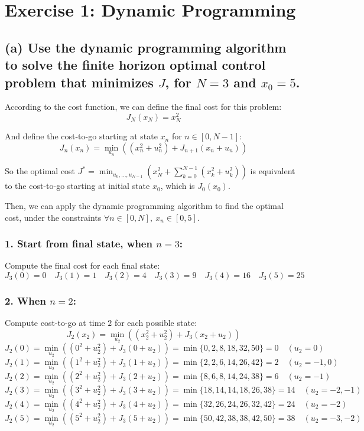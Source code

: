 \section*{Exercise 1: Dynamic Programming}

\subsection*{(a) Use the dynamic programming algorithm to solve the finite horizon optimal control problem that minimizes \( J \), for \( N = 3 \) and \( x_0 = 5 \).}

According to the cost function, we can define the final cost for this problem:
\[ J_N(x_N) = x_N^2 \]

And define the cost-to-go starting at state \( x_n \) for \( n \in [0, N-1] \):
\[ J_n(x_n) = \min_{u_n} ((x_n^2 + u_n^2) + J_{n+1}(x_n + u_n)) \]

So the optimal cost \( J^* = \min_{u_0, \ldots, u_{N-1}}(x_N^2 + \sum_{k=0}^{N-1} (x_k^2 + u_k^2)) \) is equivalent to the cost-to-go starting at initial state \( x_0 \), which is \( J_0(x_0) \).

Then, we can apply the dynamic programming algorithm to find the optimal cost, under the constraints \( \forall n \in [0, N], \ x_n \in [0, 5] \).

\subsubsection*{1. Start from final state, when \( n = 3 \):}
Compute the final cost for each final state:
\[
    J_3(0) = 0 \quad
    J_3(1) = 1 \quad
    J_3(2) = 4 \quad
    J_3(3) = 9 \quad
    J_3(4) = 16 \quad
    J_3(5) = 25
\]

\subsubsection*{2. When \( n = 2 \):}
Compute cost-to-go at time \( 2 \) for each possible state:
\[ J_2(x_2) = \min_{u_2} ((x_2^2 + u_2^2) + J_{3}(x_2 + u_2)) \]
\[ J_2(0) = \min_{u_2} ((0^2 + u_2^2) + J_{3}(0 + u_2)) = \min \{ 0, 2, 8, 18, 32, 50 \} = 0 \quad (u_2 = 0) \]
\[ J_2(1) = \min_{u_2} ((1^2 + u_2^2) + J_{3}(1 + u_2)) = \min \{ 2, 2, 6, 14, 26, 42 \} = 2 \quad (u_2 = -1, 0) \]
\[ J_2(2) = \min_{u_2} ((2^2 + u_2^2) + J_{3}(2 + u_2)) = \min \{ 8, 6, 8, 14, 24, 38 \} = 6 \quad (u_2 = -1) \]
\[ J_2(3) = \min_{u_2} ((3^2 + u_2^2) + J_{3}(3 + u_2)) = \min \{ 18, 14, 14, 18, 26, 38 \} = 14 \quad (u_2 = -2, -1) \]
\[ J_2(4) = \min_{u_2} ((4^2 + u_2^2) + J_{3}(4 + u_2)) = \min \{ 32, 26, 24, 26, 32, 42 \} = 24 \quad (u_2 = -2) \]
\[ J_2(5) = \min_{u_2} ((5^2 + u_2^2) + J_{3}(5 + u_2)) = \min \{ 50, 42, 38, 38, 42, 50 \} = 38 \quad (u_2 = -3, -2) \]

